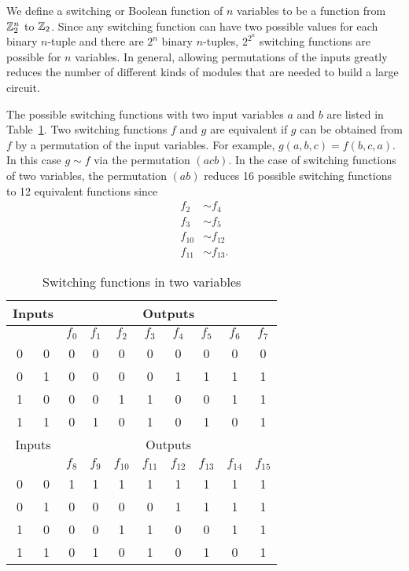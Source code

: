  
We define a {\bfi
switching\/} or
{\bfi Boolean
function\/} of $n$
variables to be a function from ${\Bbb Z}_2^n$ to ${\Bbb Z}_2$. Since 
any switching function can have two possible values for each binary
$n$-tuple and there are $2^n$ binary $n$-tuples, $2^{2^n}$ switching
functions are possible for $n$ variables. In general, allowing
permutations of the inputs greatly reduces the number of different
kinds of modules that are needed to build a large circuit.
 
 
The possible switching functions  with two input variables $a$ and
$b$ are listed in Table~\ref{switching_2variable}. Two switching functions $f$ and $g$
are equivalent if $g$ can be obtained from $f$ by a permutation of the
input variables. For example, $g(a, b, c) = f(b, c, a)$. In this 
case $g \sim f$ via the permutation $(acb)$. In the case of switching
functions of two variables, the permutation $(ab)$ reduces 16
possible switching functions to 12 equivalent functions since
\begin{align*}
f_2 & \sim  f_4 \\
f_3 & \sim  f_5 \\
f_{10} & \sim  f_{12} \\
f_{11} & \sim  f_{13}.
\end{align*}
 
 
\begin{table}[htb]
\caption{Switching functions in two variables}{\small
\medskip
\begin{center}
\begin{tabular}{|cc|cccccccc|}
\hline
\multicolumn{2}{|c|}{Inputs}
 & \multicolumn{8}{|c|}{Outputs}    \\
\hline
         &     & $f_0$ & $f_1$ & $f_2$ & $f_3$ & $f_4$ &
$f_5$ & $f_6$ & $f_7$  \\ \hline
0 & 0   & 0 & 0 & 0 & 0 & 0 & 0 & 0 & 0 \\
0 & 1   & 0 & 0 & 0 & 0 & 1 & 1 & 1 & 1 \\
1 & 0   & 0 & 0 & 1 & 1 & 0 & 0 & 1 & 1 \\
1 & 1   & 0 & 1 & 0 & 1 & 0 & 1 & 0 & 1 \\ \hline\hline
\multicolumn{2}{|c|}{Inputs}
 & \multicolumn{8}{|c|}{Outputs}    \\
\hline
         &     & $f_8$ & $f_9$ & $f_{10}$ & $f_{11}$
& $f_{12}$ & $f_{13}$ & $f_{14}$ & $f_{15}$ \\ \hline
0 & 0   & 1 & 1 & 1 & 1 & 1 & 1 & 1 & 1 \\
0 & 1   & 0 & 0 & 0 & 0 & 1 & 1 & 1 & 1 \\
1 & 0   & 0 & 0 & 1 & 1 & 0 & 0 & 1 & 1 \\
1 & 1   & 0 & 1 & 0 & 1 & 0 & 1 & 0 & 1 \\ \hline
\end{tabular}
\end{center}\label{switching_2variable}
}
\end{table}
 
